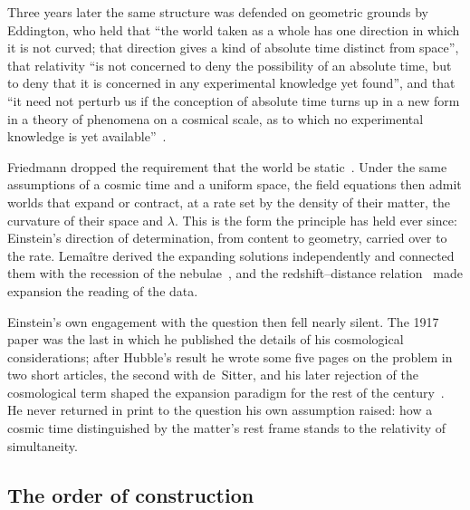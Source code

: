 \documentclass[twocolumn]{aastex701}
\begin{document}
Three years later the same structure was defended on geometric grounds by Eddington, who held that ``the world taken as a whole has one direction in which it is not curved; that direction gives a kind of absolute time distinct from space'', that relativity ``is not concerned to deny the possibility of an absolute time, but to deny that it is concerned in any experimental knowledge yet found'', and that ``it need not perturb us if the conception of absolute time turns up in a new form in a theory of phenomena on a cosmical scale, as to which no experimental knowledge is yet available''~\citep{Eddington1920}.

Friedmann dropped the requirement that the world be static~\citep{Friedmann1922, Friedmann1924}. Under the same assumptions of a cosmic time and a uniform space, the field equations then admit worlds that expand or contract, at a rate set by the density of their matter, the curvature of their space and $\lambda$. This is the form the principle has held ever since: Einstein's direction of determination, from content to geometry, carried over to the rate. Lema\^itre derived the expanding solutions independently and connected them with the recession of the nebulae~\citep{Lemaitre1927}, and the redshift--distance relation~\citep{Hubble1929} made expansion the reading of the data.

Einstein's own engagement with the question then fell nearly silent. The 1917 paper was the last in which he published the details of his cosmological considerations; after Hubble's result he wrote some five pages on the problem in two short articles, the second with de~Sitter, and his later rejection of the cosmological term shaped the expansion paradigm for the rest of the century~\citep{JanzenEinsteinCosmology}. He never returned in print to the question his own assumption raised: how a cosmic time distinguished by the matter's rest frame stands to the relativity of simultaneity.

\subsection{The order of construction}\label{sec:order}
\end{document}
